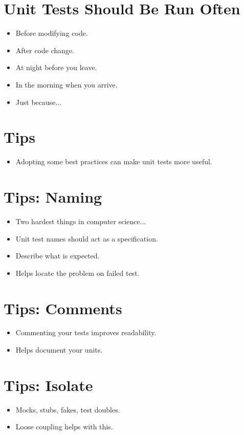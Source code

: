 \documentclass{article}
\begin{document}
\newpage
\section{Unit Tests Should Be Run Often}
\begin{itemize}
    \item Before modifying code.
    \item After code change.
    \item At night before you leave.
    \item In the morning when you arrive.
    \item Just because...
\end{itemize}

\newpage
\section{Tips}
\begin{itemize}
    \item Adopting some best practices can make unit tests more useful.
\end{itemize}

\newpage
\section{Tips: Naming}
\begin{itemize}
    \item Two hardest things in computer science...
    \item Unit test names should act as a specification.
    \item Describe what is expected.
    \item Helps locate the problem on failed test.
\end{itemize}

\newpage
\section{Tips: Comments}
\begin{itemize}
    \item Commenting your tests improves readability.
    \item Helps document your units.
\end{itemize}

\newpage
\section{Tips: Isolate}
\begin{itemize}
    \item Mocks, stubs, fakes, test doubles.
    \item Loose coupling helps with this.
\end{itemize}
\end{document}
